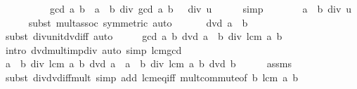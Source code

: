 \begin{isabellebody}
\ \ \ \ \ \ \ \ \ \ gcd\ a\ b\ {\isacharasterisk}{\kern0pt}\ {\isacharparenleft}{\kern0pt}{\isacharparenleft}{\kern0pt}a\ {\isacharasterisk}{\kern0pt}\ b\ div\ gcd\ a\ b{\isacharparenright}{\kern0pt}\ {\isacharasterisk}{\kern0pt}\ {\isacharparenleft}{\kern0pt}{}\ div\ {\isacharquery}{\kern0pt}u{\isacharparenright}{\kern0pt}{\isacharparenright}{\kern0pt}{\isachardoublequoteclose}\isanewline
\ \ \ \ \isamarkupfalse%
\ simp\isanewline
\ \ \isamarkupfalse%
\ \isamarkupfalse%
\ {\isachardoublequoteopen}{\isasymdots}\ {\isacharequal}{\kern0pt}\ a\ {\isacharasterisk}{\kern0pt}\ b\ div\ {\isacharquery}{\kern0pt}u{\isachardoublequoteclose}\isanewline
\ \ \ \ \isamarkupfalse%
\ {\isacharparenleft}{\kern0pt}subst\ mult{\isachardot}{\kern0pt}assoc\ {\isacharbrackleft}{\kern0pt}symmetric{\isacharbrackright}{\kern0pt}{\isacharparenright}{\kern0pt}\ auto\isanewline
\ \ \isamarkupfalse%
\ \isamarkupfalse%
\ {\isachardoublequoteopen}{\isasymdots}\ dvd\ a\ {\isacharasterisk}{\kern0pt}\ b{\isachardoublequoteclose}\isanewline
\ \ \ \ \isamarkupfalse%
\ {\isacharparenleft}{\kern0pt}subst\ div{\isacharunderscore}{\kern0pt}unit{\isacharunderscore}{\kern0pt}dvd{\isacharunderscore}{\kern0pt}iff{\isacharparenright}{\kern0pt}\ auto\isanewline
\ \ \isamarkupfalse%
\ \isamarkupfalse%
\ {\isachardoublequoteopen}gcd\ a\ b\ dvd\ {\isacharparenleft}{\kern0pt}{\isacharparenleft}{\kern0pt}a\ {\isacharasterisk}{\kern0pt}\ b{\isacharparenright}{\kern0pt}\ div\ lcm\ a\ b{\isacharparenright}{\kern0pt}{\isachardoublequoteclose}\isanewline
\ \ \ \ \isamarkupfalse%
\ {\isacharparenleft}{\kern0pt}intro\ dvd{\isacharunderscore}{\kern0pt}mult{\isacharunderscore}{\kern0pt}imp{\isacharunderscore}{\kern0pt}div{\isacharparenright}{\kern0pt}\ {\isacharparenleft}{\kern0pt}auto\ simp{\isacharcolon}{\kern0pt}\ lcm{\isacharunderscore}{\kern0pt}gcd{\isacharparenright}{\kern0pt}\isanewline
\ \ \isamarkupfalse%
\ \isamarkupfalse%
\ {\isachardoublequoteopen}a\ {\isacharasterisk}{\kern0pt}\ b\ div\ lcm\ a\ b\ dvd\ a{\isachardoublequoteclose}\ \ {\isachardoublequoteopen}a\ {\isacharasterisk}{\kern0pt}\ b\ div\ lcm\ a\ b\ dvd\ b{\isachardoublequoteclose}\isanewline
\ \ \ \ \isamarkupfalse%
\ assms\ \isamarkupfalse%
\ {\isacharparenleft}{\kern0pt}subst\ div{\isacharunderscore}{\kern0pt}dvd{\isacharunderscore}{\kern0pt}iff{\isacharunderscore}{\kern0pt}mult{\isacharsemicolon}{\kern0pt}\ simp\ add{\isacharcolon}{\kern0pt}\ lcm{\isacharunderscore}{\kern0pt}eq{\isacharunderscore}{\kern0pt}{}{\isacharunderscore}{\kern0pt}iff\ mult{\isachardot}{\kern0pt}commute{\isacharbrackleft}{\kern0pt}of\ b\ {\isachardoublequoteopen}lcm\ a\ b{\isachardoublequoteclose}{\isacharbrackright}{\kern0pt}{\isacharparenright}{\kern0pt}{\isacharplus}{\kern0pt}\isanewline

\end{isabellebody}

